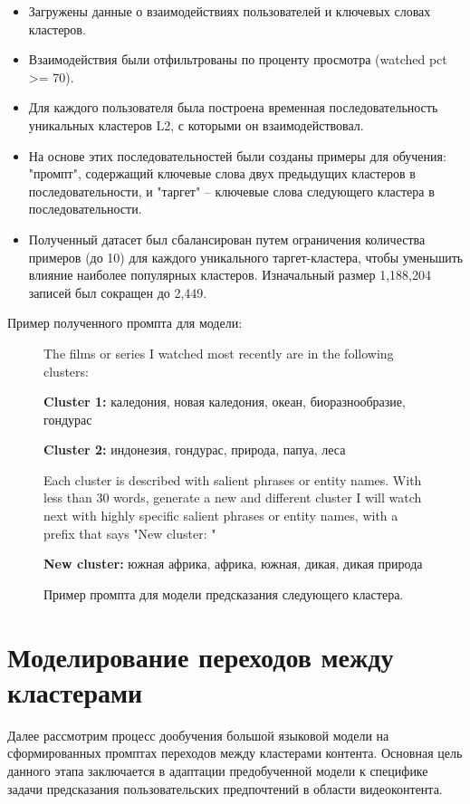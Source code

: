 \begin{itemize}
    \item Загружены данные о взаимодействиях пользователей и ключевых словах кластеров.
    \item Взаимодействия были отфильтрованы по проценту просмотра (watched pct >= 70).
    \item Для каждого пользователя была построена временная последовательность уникальных кластеров L2, с которыми он взаимодействовал.
    \item На основе этих последовательностей были созданы примеры для обучения: "промпт", содержащий ключевые слова двух предыдущих кластеров в последовательности, и "таргет" – ключевые слова следующего кластера в последовательности.
    \item Полученный датасет был сбалансирован путем ограничения количества примеров (до 10) для каждого уникального таргет-кластера, чтобы уменьшить влияние наиболее популярных кластеров. Изначальный размер 1,188,204 записей был сокращен до 2,449.
\end{itemize}

Пример полученного промпта для модели:

\begin{figure}[h]
\centering
\begin{tcolorbox}[
    colback=gray!5,
    colframe=gray!50,
    boxrule=1pt,
    arc=2pt,
    left=10pt,
    right=10pt,
    top=10pt,
    bottom=10pt,
    width=0.9\textwidth
]
\small\ttfamily
The films or series I watched most recently are in the following clusters:

\textbf{Cluster 1:} каледония, новая каледония, океан, биоразнообразие, гондурас

\textbf{Cluster 2:} индонезия, гондурас, природа, папуа, леса

Each cluster is described with salient phrases or entity names.
With less than 30 words, generate a new and different cluster I will watch next
with highly specific salient phrases or entity names, with a prefix that says "New cluster: "

\textbf{New cluster:} южная африка, африка, южная, дикая, дикая природа
\end{tcolorbox}
\caption{Пример промпта для модели предсказания следующего кластера.}
\label{fig:prompt_example}
\end{figure}

\section*{Моделирование переходов между кластерами}
Далее рассмотрим процесс дообучения большой языковой модели на сформированных промптах переходов между кластерами контента. Основная цель данного этапа заключается в адаптации предобученной модели к специфике задачи предсказания пользовательских предпочтений в области видеоконтента.

